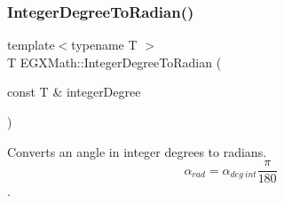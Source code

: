 \mbox{\label{group___e_g_x_math-_angle_conversions-_integer_degree_ga05d3368b00ea27b9895de2ffe5c8df38}} 
\subsubsection{\texorpdfstring{Integer\+Degree\+To\+Radian()}{IntegerDegreeToRadian()}}
{\footnotesize\ttfamily template$<$typename T $>$ \\
T E\+G\+X\+Math\+::\+Integer\+Degree\+To\+Radian (\begin{DoxyParamCaption}\item[{const T \&}]{integer\+Degree }\end{DoxyParamCaption})}



Converts an angle in integer degrees to radians. \[\alpha_{rad}=\alpha_{deg\ int}\frac{\pi}{180}\]. 

